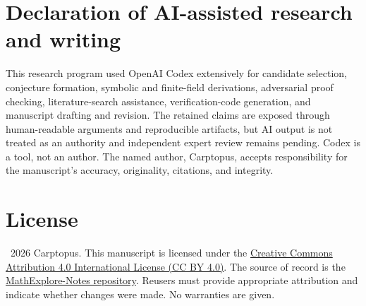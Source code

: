 \documentclass[11pt]{article}
\theoremstyle{definition}\newtheorem{definition}[theorem]{Definition}
\theoremstyle{remark}\newtheorem{remark}[theorem]{Remark}
\begin{document}
\section*{Declaration of AI-assisted research and writing}
This research program used OpenAI Codex extensively for candidate selection,
conjecture formation, symbolic and finite-field derivations, adversarial proof
checking, literature-search assistance, verification-code generation, and
manuscript drafting and revision.  The retained claims are exposed through
human-readable arguments and reproducible artifacts, but AI output is not
treated as an authority and independent expert review remains pending.  Codex
is a tool, not an author.  The named author, Carptopus, accepts responsibility
for the manuscript's accuracy, originality, citations, and integrity.

\section*{License}
\textcopyright\ 2026 Carptopus.  This manuscript is licensed under the
\href{https://creativecommons.org/licenses/by/4.0/}{Creative Commons
Attribution 4.0 International License (CC BY 4.0)}.  The source of record is
the \href{https://github.com/Carptopus/MathExplore-Notes}{MathExplore-Notes
repository}.  Reusers must provide appropriate attribution and indicate
whether changes were made.  No warranties are given.
\end{document}
